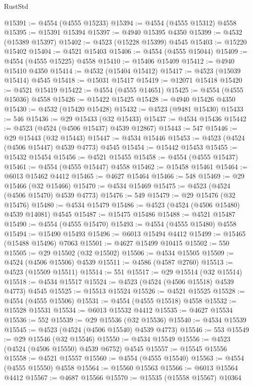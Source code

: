 \begin{lexlean}{RustStd}
\begin{coremodule}
@15391 := @4554 (@4555 @15233)
@15394 := @4554 (@4555 @15312) @4558
@15395 := @15391 @15394
@15397 := @4940 @15395 @4350
@15399 := @4532 (@15389 @15397)
@15402 := @4523 (@15228 @15399) @4545
@15403 := @15220 @15402
@15404 := @4521 @15403
@15406 := @4554 (@4555 @15044)
@15409 := @4554 (@4555 @15225) @4558
@15410 := @15406 @15409
@15412 := @4940 @15410 @4350
@15414 := @4532 (@15404 @15412)
@15417 := @4523 (@15039 @15414) @4545
@15418 := @15031 @15417
@15419 := @12071 @15418
@15420 := @4521 @15419
@15422 := @4554 (@4555 @14651)
@15425 := @4554 (@4555 @15036) @4558
@15426 := @15422 @15425
@15428 := @4940 @15426 @4350
@15430 := @4532 (@15420 @15428)
@15432 := @4523 (@9481 @15430)
@15433 := 546
@15436 := @29 @15433 (@32 @15433)
@15437 := @4534 @15436
@15442 := @4523 (@4524 (@4506 @15437) @4539 @12867)
@15443 := 547
@15446 := @29 @15443 (@32 @15443)
@15447 := @4534 @15446
@15453 := @4523 (@4524 (@4506 @15447) @4539 @4773) @4545
@15454 := @15442 @15453
@15455 := @15432 @15454
@15456 := @4521 @15455
@15458 := @4554 (@4555 @15437)
@15461 := @4554 (@4555 @15447) @4558
@15462 := @15458 @15461
@15464 := @6013 @15462 @4412
@15465 := @4627 @15464
@15466 := 548
@15469 := @29 @15466 (@32 @15466)
@15470 := @4534 @15469
@15475 := @4523 (@4524 (@4506 @15470) @4539 @4773)
@15476 := 549
@15479 := @29 @15476 (@32 @15476)
@15480 := @4534 @15479
@15486 := @4523 (@4524 (@4506 @15480) @4539 @14081) @4545
@15487 := @15475 @15486
@15488 := @4521 @15487
@15490 := @4554 (@4555 @15470)
@15493 := @4554 (@4555 @15480) @4558
@15494 := @15490 @15493
@15496 := @6013 @15494 @4412
@15499 := @15465 (@15488 @15496) @7063
@15501 := @4627 @15499 @10415
@15502 := 550
@15505 := @29 @15502 (@32 @15502)
@15506 := @4534 @15505
@15509 := @4524 (@4506 @15506) @4539
@15511 := @4586 (@4587 @2760)
@15513 := @4523 (@15509 @15511)
@15514 := 551
@15517 := @29 @15514 (@32 @15514)
@15518 := @4534 @15517
@15524 := @4523 (@4524 (@4506 @15518) @4539 @4773) @4545
@15525 := @15513 @15524
@15526 := @4521 @15525
@15528 := @4554 (@4555 @15506)
@15531 := @4554 (@4555 @15518) @4558
@15532 := @15528 @15531
@15534 := @6013 @15532 @4412
@15535 := @4627 @15534
@15536 := 552
@15539 := @29 @15536 (@32 @15536)
@15540 := @4534 @15539
@15545 := @4523 (@4524 (@4506 @15540) @4539 @4773)
@15546 := 553
@15549 := @29 @15546 (@32 @15546)
@15550 := @4534 @15549
@15556 := @4523 (@4524 (@4506 @15550) @4539 @6752) @4545
@15557 := @15545 @15556
@15558 := @4521 @15557
@15560 := @4554 (@4555 @15540)
@15563 := @4554 (@4555 @15550) @4558
@15564 := @15560 @15563
@15566 := @6013 @15564 @4412
@15567 := @4687 @15566
@15570 := @15535 (@15558 @15567) @10364

\end{coremodule}
\end{lexlean}
